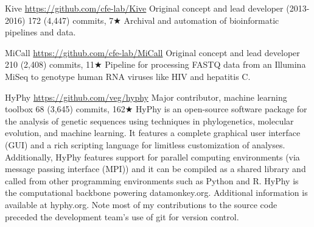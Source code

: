 {Kive}
{\url{https://github.com/cfe-lab/Kive}}
{Original concept and lead developer (2013-2016)}
{172 (4,447) commits, 7$\bigstar$}
{Archival and automation of bioinformatic pipelines and data.}


{MiCall}
{\url{https://github.com/cfe-lab/MiCall}}
{Original concept and lead developer}
{210 (2,408) commits, 11$\bigstar$}
{Pipeline for processing FASTQ data from an Illumina MiSeq to genotype human RNA viruses like HIV and hepatitis C.}


{HyPhy}
{\url{https://github.com/veg/hyphy}}
{Major contributor, machine learning toolbox}
{68 (3,645) commits, 162$\bigstar$}
{
HyPhy is an open-source software package for the analysis of genetic sequences using techniques in phylogenetics, molecular evolution, and machine learning. 
It features a complete graphical user interface (GUI) and a rich scripting language for limitless customization of analyses. 
Additionally, HyPhy features support for parallel computing environments (via message passing interface (MPI)) and it can be compiled as a shared library and called from other programming environments such as Python and R. 
HyPhy is the computational backbone powering datamonkey.org. Additional information is available at hyphy.org.
Note most of my contributions to the source code preceded the development team's use of git for version control.
}



